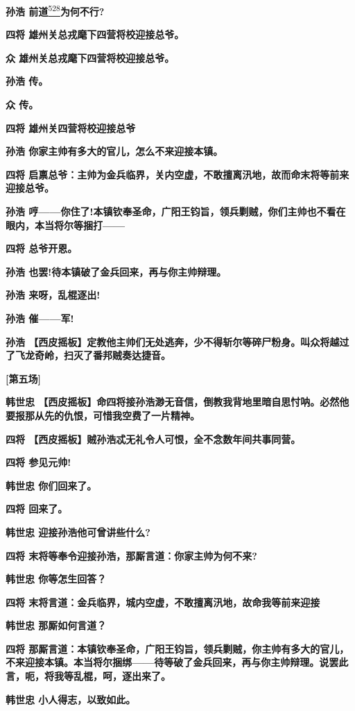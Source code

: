 \textbf{孙浩
前道}\protect\hyperlink{fn528}{\textsuperscript{528}}\textbf{为何不行?}

\textbf{四将 雄州关总戎麾下四营将校迎接总爷。}

\textbf{众 雄州关总戎麾下四营将校迎接总爷。}

\textbf{孙浩 传。}

\textbf{众 传。}

\textbf{四将 雄州关四营将校迎接总爷}

\textbf{孙浩 你家主帅有多大的官儿，怎么不来迎接本镇。}

\textbf{四将
启禀总爷：主帅为金兵临界，关内空虚，不敢擅离汛地，故而命末将等前来迎接总爷。}

\textbf{孙浩
哼------你住了!本镇钦奉圣命，广阳王钧旨，领兵剿贼，你们主帅也不看在眼内，本当将尔等捆打------}

\textbf{四将 总爷开恩。}

\textbf{孙浩 也罢!待本镇破了金兵回来，再与你主帅辩理。}

\textbf{孙浩 来呀，乱棍逐出!}

\textbf{孙浩 催------军!}

\textbf{孙浩
【西皮摇板】定教他主帅们无处逃奔，少不得斩尔等碎尸粉身。叫众将越过了飞龙奇岭，扫灭了番邦贼奏达捷音。}

\textbf{{[}第五场{]}}

\textbf{韩世忠
【西皮摇板】命四将接孙浩渺无音信，倒教我背地里暗自思忖呐。必然他要报那从先的仇恨，可惜我空费了一片精神。}

\textbf{四将 【西皮摇板】贼孙浩忒无礼令人可恨，全不念数年间共事同营。}

\textbf{四将 参见元帅!}

\textbf{韩世忠 你们回来了。}

\textbf{四将 回来了。}

\textbf{韩世忠 迎接孙浩他可曾讲些什么?}

\textbf{四将 末将等奉令迎接孙浩，那厮言道：你家主帅为何不来?}

\textbf{韩世忠 你等怎生回答？}

\textbf{四将
末将言道：金兵临界，城内空虚，不敢擅离汛地，故命我等前来迎接}

\textbf{韩世忠 那厮如何言道？}

\textbf{四将
那厮言道：本镇钦奉圣命，广阳王钧旨，领兵剿贼，你主帅有多大的官儿，不来迎接本镇。本当将尔捆绑------待等破了金兵回来，再与你主帅辩理。说罢此言，呃，将我等乱棍，呵，逐出来了。}

\textbf{韩世忠 小人得志，以致如此。}

